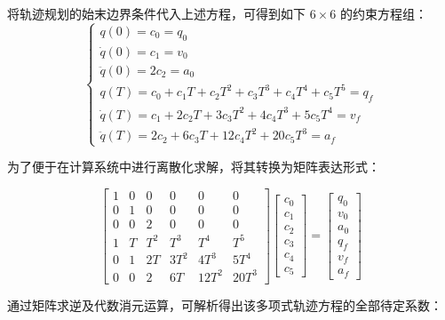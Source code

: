 将轨迹规划的始末边界条件代入上述方程，可得到如下 $6 \times 6$ 的约束方程组：
\begin{equation}
    \begin{cases}
        q(0) = c_0 = q_0 \\
        \dot{q}(0) = c_1 = v_0 \\
        \ddot{q}(0) = 2c_2 = a_0 \\
        q(T) = c_0 + c_1 T + c_2 T^2 + c_3 T^3 + c_4 T^4 + c_5 T^5 = q_f \\
        \dot{q}(T) = c_1 + 2c_2 T + 3c_3 T^2 + 4c_4 T^3 + 5c_5 T^4 = v_f \\
        \ddot{q}(T) = 2c_2 + 6c_3 T + 12c_4 T^2 + 20c_5 T^3 = a_f
    \end{cases}
\end{equation}

为了便于在计算系统中进行离散化求解，将其转换为矩阵表达形式：

\begin{equation}
    \begin{bmatrix}
        1 & 0 & 0 & 0 & 0 & 0 \\
        0 & 1 & 0 & 0 & 0 & 0 \\
        0 & 0 & 2 & 0 & 0 & 0 \\
        1 & T & T^2 & T^3 & T^4 & T^5 \\
        0 & 1 & 2T & 3T^2 & 4T^3 & 5T^4 \\
        0 & 0 & 2 & 6T & 12T^2 & 20T^3
    \end{bmatrix}
    \begin{bmatrix}
        c_0 \\ c_1 \\ c_2 \\ c_3 \\ c_4 \\ c_5
    \end{bmatrix}
    =
    \begin{bmatrix}
        q_0 \\ v_0 \\ a_0 \\ q_f \\ v_f \\ a_f
    \end{bmatrix}
\end{equation}

通过矩阵求逆及代数消元运算，可解析得出该多项式轨迹方程的全部待定系数：

